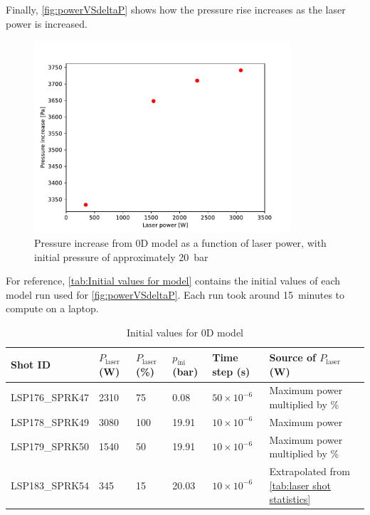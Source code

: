         Finally, \autoref{fig:powerVSdeltaP} shows how the pressure rise increases as the laser power is increased.

        \begin{figure}[!ht]
            \centering
            \includegraphics[width=0.85\textwidth]{assets/2 models/powerVSdeltaP.pdf}
            \caption{Pressure increase from 0D model as a function of laser power, with initial pressure of approximately \qty{20}{bar}}
            \label{fig:powerVSdeltaP}
        \end{figure}

        For reference, \autoref{tab:Initial values for model} contains the initial values of each model run used for \autoref{fig:powerVSdeltaP}. Each run took around \qty{15}{minutes} to compute on a laptop. 

        \begin{table}[!ht]
            \centering
            \caption{Initial values for 0D model}
            \label{tab:Initial values for model}
            \begin{tabularx}{\textwidth}{@{}lX<{\raggedright}X<{\raggedright}X<{\raggedright}X<{\raggedright}X<{\raggedright}@{}}
            \toprule
            Shot ID & $P_\mathrm{laser}$ (\unit{W}) & $P_\mathrm{laser}$ (\unit{\%}) & $p_\mathrm{ini}$ (\unit{bar}) & Time step (\unit{s}) & Source of $P_\mathrm{laser}$ (\unit{W})\\ \midrule
            LSP176\_SPRK47 & 2310      &  75     &    0.08   &  $50\times 10^{-6}$  & Maximum power multiplied by \% \\ 
            LSP178\_SPRK49 & 3080      &  100    &    19.91   &  $10\times 10^{-6}$ & Maximum power\\
            LSP179\_SPRK50 & 1540      &  50     &    19.91   &  $10\times 10^{-6}$ & Maximum power multiplied by \% \\
            LSP183\_SPRK54 & 345       &  15     &    20.03   & $10\times 10^{-6}$  & Extrapolated from \autoref{tab:laser shot statistics}\\ 
            \bottomrule
            \end{tabularx}
        \end{table}